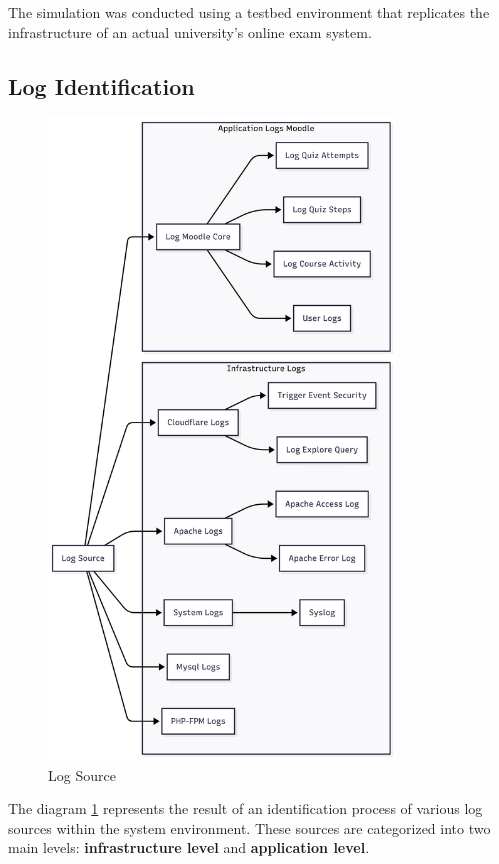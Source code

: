 The simulation was conducted using a testbed environment that replicates the infrastructure of an actual university's online exam system.

\subsection{Log Identification}
\begin{figure}[H] 
	\centering
	\includegraphics[height=17cm]{figure/log-source.png}
	\caption{Log Source}
	\label{fig:log-source}
\end{figure}
The diagram \ref{fig:log-source} represents the result of an identification process of various log sources within the system environment. These sources are categorized into two main levels: \textbf{infrastructure level} and \textbf{application level}.


